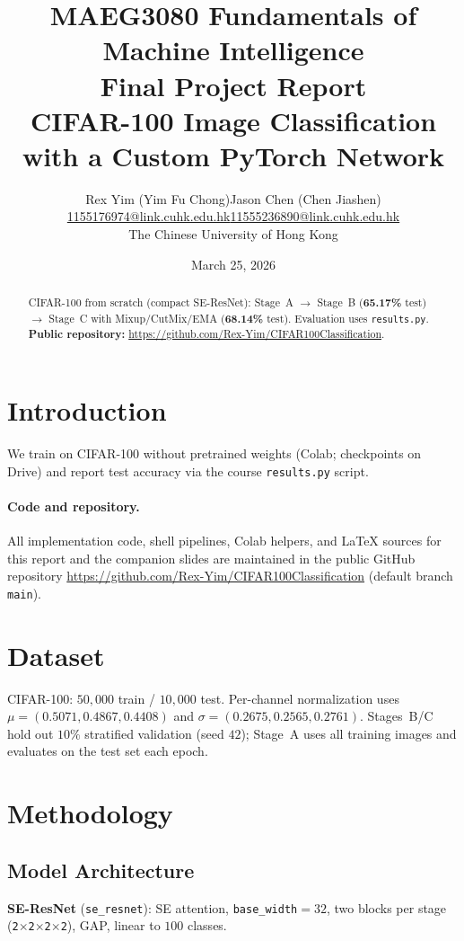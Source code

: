 \documentclass[11pt,a4paper]{article}
\title{\textbf{MAEG3080 Fundamentals of Machine Intelligence}\\Final Project Report\\[0.5em]\large CIFAR-100 Image Classification with a Custom PyTorch Network}
\author{
    \begin{tabular}{c@{\hspace{3em}}c}
        Rex Yim (Yim Fu Chong) & Jason Chen (Chen Jiashen) \\
        \url{1155176974@link.cuhk.edu.hk} & \url{11555236890@link.cuhk.edu.hk} \\
        \multicolumn{2}{c}{The Chinese University of Hong Kong}
    \end{tabular}
}
\date{March 25, 2026}
\begin{document}
\raggedbottom
\maketitle

\begin{abstract}
CIFAR-100 from scratch (compact SE-ResNet): Stage~A $\rightarrow$ Stage~B (\textbf{65.17\%} test) $\rightarrow$ Stage~C with Mixup/CutMix/EMA (\textbf{68.14\%} test). Evaluation uses \texttt{results.py}.\\
\textbf{Public repository:} \url{https://github.com/Rex-Yim/CIFAR100Classification}.
\end{abstract}

\section{Introduction}
We train on CIFAR-100 without pretrained weights (Colab; checkpoints on Drive) and report test accuracy via the course \texttt{results.py} script.
\paragraph{Code and repository.}
All implementation code, shell pipelines, Colab helpers, and \LaTeX{} sources for this report and the companion slides are maintained in the public GitHub repository
\url{https://github.com/Rex-Yim/CIFAR100Classification} (default branch \texttt{main}).

\section{Dataset}
CIFAR-100: $50{,}000$ train / $10{,}000$ test. Per-channel normalization uses $\mu=(0.5071,0.4867,0.4408)$ and $\sigma=(0.2675,0.2565,0.2761)$. Stages~B/C hold out $10\%$ stratified validation (seed $42$); Stage~A uses all training images and evaluates on the test set each epoch.

\section{Methodology}
\subsection{Model Architecture}
\textbf{SE-ResNet} (\texttt{se\_resnet}): SE attention, \texttt{base\_width}${}=32$, two blocks per stage (\texttt{2$\times$2$\times$2$\times$2}), GAP, linear to $100$ classes.
\end{document}
